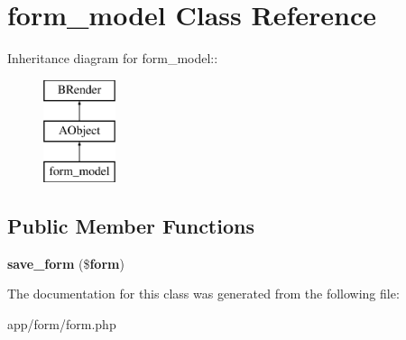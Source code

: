 \section{form\_\-model Class Reference}
\label{classform__model}
Inheritance diagram for form\_\-model::\begin{figure}[H]
\begin{center}
\leavevmode
\includegraphics[height=3cm]{classform__model}
\end{center}
\end{figure}
\subsection*{Public Member Functions}
\begin{DoxyCompactItemize}
\item 
{\bfseries save\_\-form} (\${\bf form})\label{classform__model_a1ad6d2b6b59c22e55cdca832f3dc5946}

\end{DoxyCompactItemize}


The documentation for this class was generated from the following file:\begin{DoxyCompactItemize}
\item 
app/form/form.php\end{DoxyCompactItemize}
